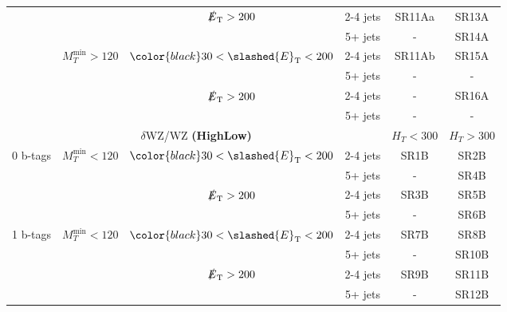 \documentclass[plain,landscape]{article}
\newcommand{\met}{\slashed{E}_\mathrm{T}}
\begin{document}
\begin{table}
\begin{tabular}{|c|c|c|c|c|c|}
                             &                                             & \multirow{2}{*}{ $\met > 200$}               & 2-4 jets    & SR11Aa                  & SR13A  \\ \cline{4-6}
                             &                                             &                                              & 5+ jets     & -                       & SR14A  \\ \cline{2-6}
                             & \multirow{4}{*}{$M_T^{\textrm{min}} > 120$} & \multirow{2}{*}{ ${\color{black} 30} < \met < 200$} & 2-4 jets    & SR11Ab                  & SR15A  \\ \cline{4-6}
                             &                                             &                                              & 5+ jets     & -                       & - \\ \cline{3-6}
                             &                                             & \multirow{2}{*}{ $\met > 200$}               & 2-4 jets    & -                       & SR16A \\ \cline{4-6}
                             &                                             &                                              & 5+ jets     & -                       & - \\ \cline{1-6}
\hline \hline
\multicolumn{4}{|c|}{ $\delta$WZ/WZ \textbf{(HighLow)} }                      & $H_T < 300$ & $ H_T > 300$  \\ \hline
\multirow{4}{*}{0 b-tags}  & \multirow{4}{*}{$M_T^{\textrm{min}} < 120$} & \multirow{2}{*}{${\color{black} 30} < \met < 200$}  & 2-4 jets & SR1B        & SR2B \\ \cline{4-6}
                           &                                             &                                              & 5+ jets  & -           & SR4B  \\ \cline{3-6}
                           &                                             & \multirow{2}{*}{$\met > 200$}                & 2-4 jets & SR3B        & SR5B  \\ \cline{4-6}
                           &                                             &                                              & 5+ jets  & -           & SR6B   \\ \cline{1-6}
\multirow{4}{*}{1 b-tags}  & \multirow{4}{*}{$M_T^{\textrm{min}} < 120$} & \multirow{2}{*}{ ${\color{black} 30} < \met < 200$} & 2-4 jets & SR7B        & SR8B  \\ \cline{4-6}
                           &                                             &                                              & 5+ jets  & -           & SR10B  \\ \cline{3-6}
                           &                                             & \multirow{2}{*}{ $\met > 200$}               & 2-4 jets & SR9B        & SR11B  \\ \cline{4-6}
                           &                                             &                                              & 5+ jets  & -           & SR12B  \\ \cline{1-6}
\end{tabular}
\end{table}
\end{document}
